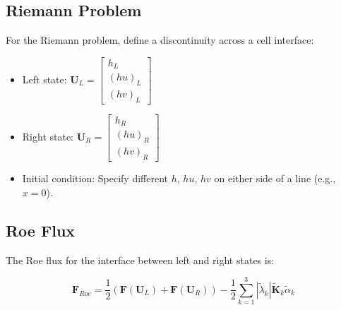 \documentclass[a4paper,12pt]{article}
\begin{document}
\subsection*{Riemann Problem}
For the Riemann problem, define a discontinuity across a cell interface:
\begin{itemize}
    \item Left state: \(\mathbf{U}_L = \begin{bmatrix} h_L \\ (hu)_L \\ (hv)_L \end{bmatrix}\)
    \item Right state: \(\mathbf{U}_R = \begin{bmatrix} h_R \\ (hu)_R \\ (hv)_R \end{bmatrix}\)
    \item Initial condition: Specify different \(h\), \(hu\), \(hv\) on either side of a line (e.g., \(x = 0\)).
\end{itemize}

\subsection*{Roe Flux}
The Roe flux for the interface between left and right states is:

\[
\mathbf{F}_{Roe} = \frac{1}{2} \left( \mathbf{F}(\mathbf{U}_L) + \mathbf{F}(\mathbf{U}_R) \right) - \frac{1}{2} \sum_{k=1}^3 |\tilde{\lambda}_k| \tilde{\mathbf{K}}_k \tilde{\alpha}_k
\]
\end{document}
